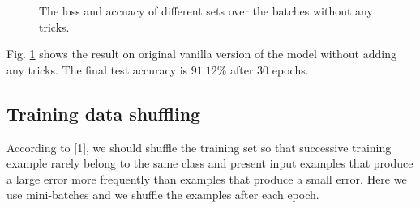 \documentclass{article} %
\begin{document}
\begin{figure} [!htbp]
	
	\caption{The loss and accuacy of different sets over the batches without any tricks. }  
	\label{fig:P1}
\end{figure}

Fig. \ref{fig:P1} shows the result on original vanilla version of the model without adding any tricks. The final test accuracy is $91.12\%$ after 30 epochs. 

\subsection{Training data shuffling}
According to [1], we should shuffle the training set so that successive training example rarely belong to the same class and present input examples that produce a large error more frequently than examples that produce a small error. Here we use mini-batches and we shuffle the examples after each epoch. 
\end{document}
